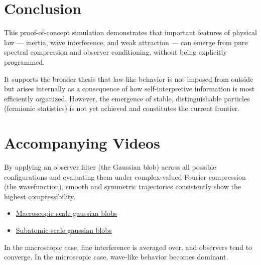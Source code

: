 \section{Conclusion}

This proof-of-concept simulation demonstrates that important features of physical law — inertia, wave interference, and weak attraction — can emerge from pure spectral compression and observer conditioning, without being explicitly programmed.

It supports the broader thesis that law-like behavior is not imposed from outside but arises internally as a consequence of how self-interpretive information is most efficiently organized.
However, the emergence of stable, distinguishable particles (fermionic statistics) is not yet achieved and constitutes the current frontier.


\section{Accompanying Videos}

By applying an observer filter (the Gaussian blob) across all possible configurations and evaluating them under complex-valued Fourier compression (the wavefunction), smooth and symmetric trajectories consistently show the highest compressibility.

\begin{itemize}
    \item \href{https://youtu.be/G6p1Nrd1zBQ}{Macroscopic scale gaussian blobs}
    \item \href{https://youtu.be/Tx-LDoXpfWM}{Subatomic scale gaussian blobs}
\end{itemize}

In the macroscopic case, fine interference is averaged over, and observers tend to converge.
In the microscopic case, wave-like behavior becomes dominant.
